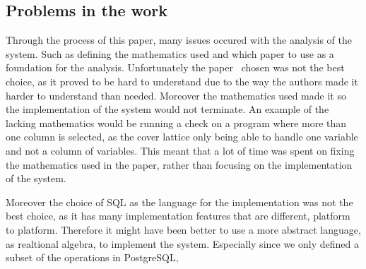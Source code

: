\subsection{Problems in the work}
Through the process of this paper, many issues occured with the analysis of the system. Such as defining the mathematics used and which paper to use as a foundation for the analysis. Unfortunately the paper~\cite{halder_abstract_2012} chosen was not the best choice, as it proved to be hard to understand due to the way the authors made it harder to understand than needed. Moreover the mathematics used made it so the implementation of the system would not terminate. 
An example of the lacking mathematics would be running a check on a program where more than one column is selected, as the cover lattice only being able to handle one variable and not a column of variables.
This meant that a lot of time was spent on fixing the mathematics used in the paper, rather than focusing on the implementation of the system.

Moreover the choice of SQL as the language for the implementation was not the best choice, as it has many implementation features that are different, platform to platform. Therefore it might have been better to use a more abstract language, as realtional algebra, to implement the system.
Especially since we only defined a subset of the operations in PostgreSQL, 